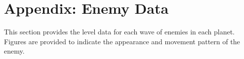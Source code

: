 \chapter{Appendix: Enemy Data}
This section provides the level data for each wave of enemies in each
planet. Figures are provided to indicate the appearance and movement
pattern of the enemy.



